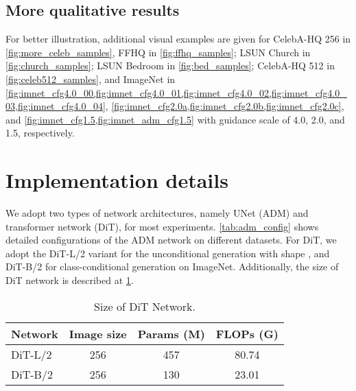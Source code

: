 \documentclass{article}
\newcommand{\minisection}[1]{\vspace{2mm}\noindent{\textbf{#1}}}
\theoremstyle{plain}
\theoremstyle{definition}
\theoremstyle{remark}
\begin{document}
\subsection{More qualitative results}
For better illustration, additional visual examples are given for CelebA-HQ 256 in \cref{fig:more_celeb_samples}, FFHQ in \cref{fig:ffhq_samples}; LSUN Church in \cref{fig:church_samples}; LSUN Bedroom in \cref{fig:bed_samples}; CelebA-HQ 512 in \cref{fig:celeb512_samples}, and ImageNet in \cref{fig:imnet_cfg4.0_00,fig:imnet_cfg4.0_01,fig:imnet_cfg4.0_02,fig:imnet_cfg4.0_03,fig:imnet_cfg4.0_04}, \cref{fig:imnet_cfg2.0a,fig:imnet_cfg2.0b,fig:imnet_cfg2.0c}, and \cref{fig:imnet_cfg1.5,fig:imnet_adm_cfg1.5} with guidance scale of 4.0, 2.0, and 1.5, respectively.



\section{Implementation details}
\minisection{Network configuration.} 
We adopt two types of network architectures, namely UNet (ADM) and transformer network (DiT), for most experiments. \cref{tab:adm_config} shows detailed configurations of the ADM network on different datasets. For DiT, we adopt the DiT-L/2 variant for the unconditional generation with shape , and DiT-B/2 for class-conditional generation on ImageNet. Additionally, the size of DiT network is described at \cref{tab:network_size}. 

\begin{table}[t]
    \centering
    \caption{Size of DiT Network.}
    \begin{tabular}{l|c|c|c}
        \toprule
        Network & Image size & Params (M) & FLOPs (G) \\
        \toprule
        DiT-L/2 & 256 & 457 & 80.74 \\
        DiT-B/2 & 256 & 130 & 23.01 \\
        \bottomrule
    \end{tabular}
    \label{tab:network_size}
\end{table}
\end{document}
